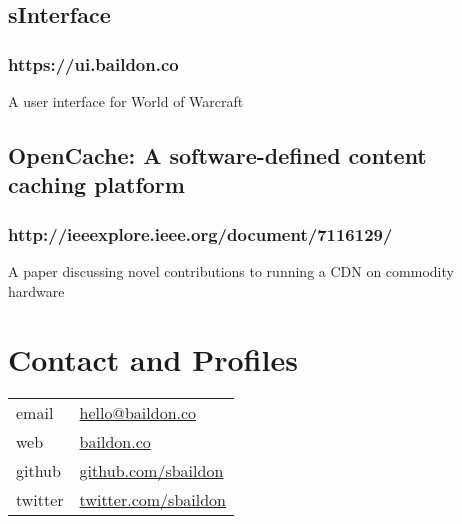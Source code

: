 \documentclass[a4paper,11pt]{article}
\begin{document}
\begin{multicols*}{2}
\subsection*{sInterface}
\subsubsection*{https://ui.baildon.co}
A user interface for World of Warcraft
\subsection*{OpenCache: A software-defined content caching platform}
\subsubsection*{http://ieeexplore.ieee.org/document/7116129/}
A paper discussing novel contributions to running a CDN on commodity hardware

\section*{Contact and Profiles}
\noindent \begin{tabular}{@{}ll}
email & \href{mailto:hello@baildon.co}{hello@baildon.co} \\
web & \href{https://baildon.co}{baildon.co} \\
github & \href{https://github.com/sbaildon}{github.com/sbaildon} \\
twitter & \href{https://twitter.com/sbaildon}{twitter.com/sbaildon}
\end{tabular}

\end{multicols*}
\end{document}

